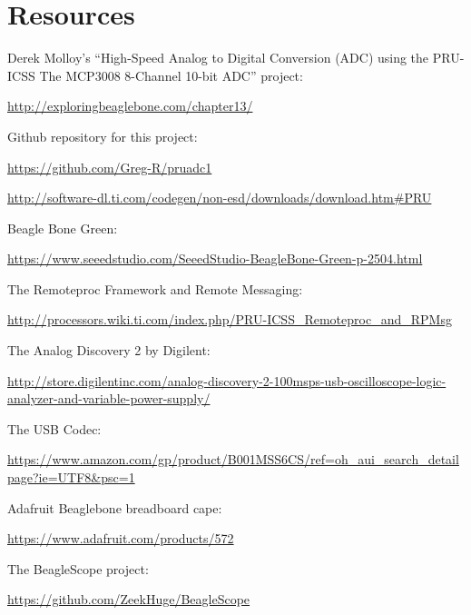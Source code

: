 %
%
%

\chapter{Resources}

Derek Molloy's ``High-Speed Analog to Digital Conversion (ADC) using the PRU-ICSS
The MCP3008 8-Channel 10-bit ADC'' project:

\url{http://exploringbeaglebone.com/chapter13/}


Github repository for this project:

\url{https://github.com/Greg-R/pruadc1}

\url{http://software-dl.ti.com/codegen/non-esd/downloads/download.htm#PRU}

Beagle Bone Green:

\url{https://www.seeedstudio.com/SeeedStudio-BeagleBone-Green-p-2504.html}

The Remoteproc Framework and Remote Messaging:

\url{http://processors.wiki.ti.com/index.php/PRU-ICSS_Remoteproc_and_RPMsg}

The Analog Discovery 2 by Digilent:

\url{http://store.digilentinc.com/analog-discovery-2-100msps-usb-oscilloscope-logic-analyzer-and-variable-power-supply/}

The USB Codec:

\url{https://www.amazon.com/gp/product/B001MSS6CS/ref=oh_aui_search_detailpage?ie=UTF8&psc=1}

Adafruit Beaglebone breadboard cape:

\url{https://www.adafruit.com/products/572}

The BeagleScope project:

\url{https://github.com/ZeekHuge/BeagleScope}
